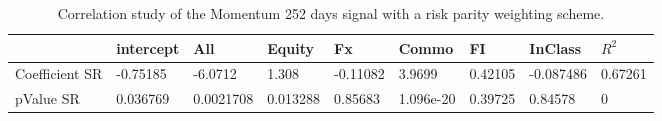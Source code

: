 \begin{table}[H]
\centering
\begin{tabular}{lllllllll}
\hline& intercept & All & Equity & Fx & Commo & FI & InClass & $R^{2}$ \\ 
\hline 
Coefficient SR & -0.75185 & -6.0712 & 1.308 & -0.11082 & 3.9699 & 0.42105 & -0.087486 & 0.67261 \\ 
pValue SR & 0.036769 & 0.0021708 & 0.013288 & 0.85683 & 1.096e-20 & 0.39725 & 0.84578 & 0 \\ 
\hline
\end{tabular}
\caption{Correlation study of the Momentum 252 days signal with a risk parity weighting scheme.}
\label{MOM252RP_CORR}
\end{table}